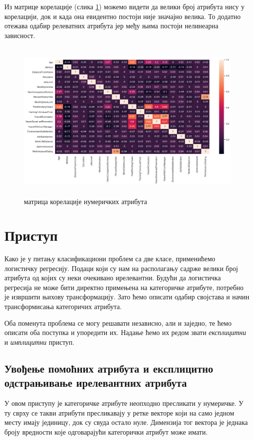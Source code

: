 \documentclass[12pt, a4paper]{article}
\begin{document}
	Из матрице корелације (слика \ref{fig:corr}) можемо видети да велики број атрибута нису у корелацији, док и када она евидентно постоји није значајно велика. То додатно отежава одабир релеватних атрибута јер међу њима постоји нелинеарна зависност.
	
	\begin{figure}[H]
		\centering
		\includegraphics[height=8cm]{graphics/full_correlation.png}
		\caption{матрица корелације нумеричких атрибута}
		\label{fig:corr}
	\end{figure}

\section{Приступ}
	Како је у питању класификациони проблем са две класе, применићемо логистичку регресију. Подаци који су нам на располагању садрже велики број атрибута од којих су неки очекивано ирелевантни. Будући да логистичка регресија не може бити директно примењена на категоричке атрибуте, потребно је извршити њихову трансформацију. Зато ћемо описати одабир својстава и начин трансформисања категоричих атрибута.
	
	Оба поменута проблема се могу решавати независно, али и заједно, те ћемо описати оба поступка и упоредити их. Надање ћемо их редом звати \textit{експлицитни} и \textit{имплицитни} приступ.
	
	\subsection{Увођење помоћних атрибута и експлицитно одстрањивање ирелевантних атрибута} \label{app:1}
	У овом приступу је категоричке атрибуте неопходно пресликати у нумеричке. У ту сврху се такви атрибути пресликавају у ретке векторе који на само једном месту имају јединицу, док су свуда остало нуле. Димензија тог вектора је једнака броју вредности које одговарајући категорички атрибут може имати.
\end{document}
